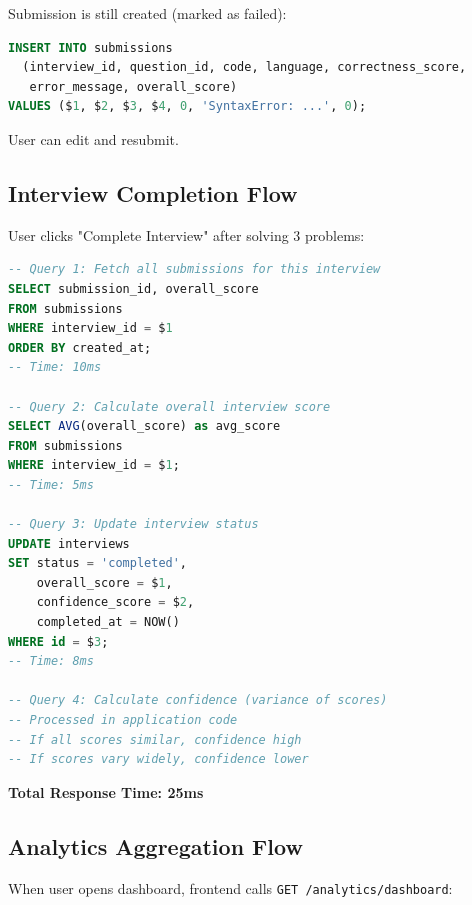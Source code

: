 \documentclass[12pt,a4paper,oneside]{article}
\begin{document}
Submission is still created (marked as failed):

\begin{lstlisting}[language=SQL, caption=Failed Submission Record]
INSERT INTO submissions 
  (interview_id, question_id, code, language, correctness_score, 
   error_message, overall_score)
VALUES ($1, $2, $3, $4, 0, 'SyntaxError: ...', 0);
\end{lstlisting}

User can edit and resubmit.

\subsection{Interview Completion Flow}

User clicks "Complete Interview" after solving 3 problems:

\begin{lstlisting}[language=SQL, caption=Interview Completion Query Sequence]
-- Query 1: Fetch all submissions for this interview
SELECT submission_id, overall_score 
FROM submissions 
WHERE interview_id = $1
ORDER BY created_at;
-- Time: 10ms

-- Query 2: Calculate overall interview score
SELECT AVG(overall_score) as avg_score
FROM submissions
WHERE interview_id = $1;
-- Time: 5ms

-- Query 3: Update interview status
UPDATE interviews
SET status = 'completed',
    overall_score = $1,
    confidence_score = $2,
    completed_at = NOW()
WHERE id = $3;
-- Time: 8ms

-- Query 4: Calculate confidence (variance of scores)
-- Processed in application code
-- If all scores similar, confidence high
-- If scores vary widely, confidence lower
\end{lstlisting}

\textbf{Total Response Time: \textbf{25ms}}

\subsection{Analytics Aggregation Flow}

When user opens dashboard, frontend calls \texttt{GET /analytics/dashboard}:
\end{document}

